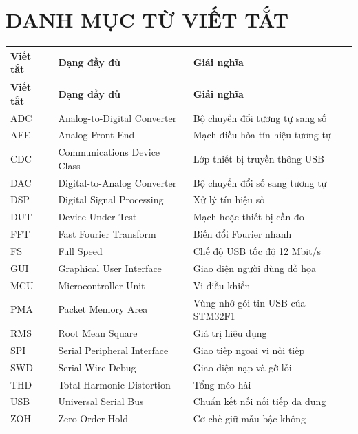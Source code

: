 \documentclass[12pt,a4paper]{report}
\newcommand{\tableheadcolor}{\rowcolor{gray!18}}
\begin{document}
\chapter*{DANH MỤC TỪ VIẾT TẮT}
\begin{longtable}{|p{2.3cm}|p{4.7cm}|p{5.8cm}|}
\hline
\tableheadcolor\textbf{Viết tắt} & \textbf{Dạng đầy đủ} & \textbf{Giải nghĩa} \\ \hline
\endfirsthead
\hline
\tableheadcolor\textbf{Viết tắt} & \textbf{Dạng đầy đủ} & \textbf{Giải nghĩa} \\ \hline
\endhead
ADC & Analog-to-Digital Converter & Bộ chuyển đổi tương tự sang số \\ \hline
AFE & Analog Front-End & Mạch điều hòa tín hiệu tương tự \\ \hline
CDC & Communications Device Class & Lớp thiết bị truyền thông USB \\ \hline
DAC & Digital-to-Analog Converter & Bộ chuyển đổi số sang tương tự \\ \hline
DSP & Digital Signal Processing & Xử lý tín hiệu số \\ \hline
DUT & Device Under Test & Mạch hoặc thiết bị cần đo \\ \hline
FFT & Fast Fourier Transform & Biến đổi Fourier nhanh \\ \hline
FS & Full Speed & Chế độ USB tốc độ 12 Mbit/s \\ \hline
GUI & Graphical User Interface & Giao diện người dùng đồ họa \\ \hline
MCU & Microcontroller Unit & Vi điều khiển \\ \hline
PMA & Packet Memory Area & Vùng nhớ gói tin USB của STM32F1 \\ \hline
RMS & Root Mean Square & Giá trị hiệu dụng \\ \hline
SPI & Serial Peripheral Interface & Giao tiếp ngoại vi nối tiếp \\ \hline
SWD & Serial Wire Debug & Giao diện nạp và gỡ lỗi \\ \hline
THD & Total Harmonic Distortion & Tổng méo hài \\ \hline
USB & Universal Serial Bus & Chuẩn kết nối nối tiếp đa dụng \\ \hline
ZOH & Zero-Order Hold & Cơ chế giữ mẫu bậc không \\ \hline
\end{longtable}
\clearpage

\end{document}
